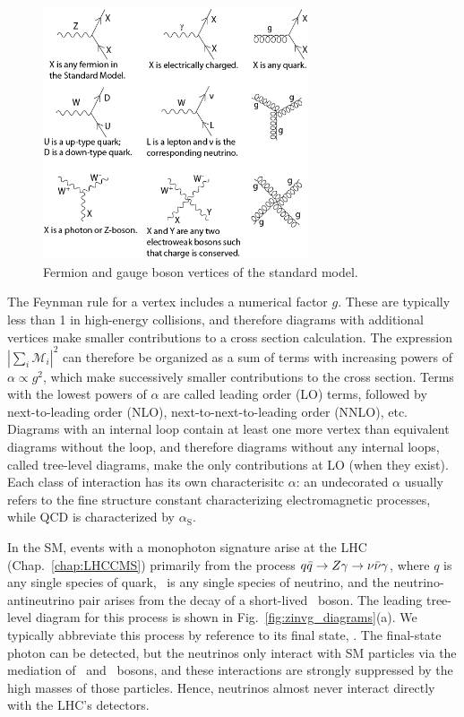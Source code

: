 \documentclass[oneside, letterpaper, 12pt, oldfontcommands]{memoir}
\begin{document}
\begin{figure}[hbtp]
  \begin{center}
    \includegraphics[width=0.7\textwidth]{Figures/Standard_Model_Feynman_Diagram_Vertices.png}
    \caption{
      Fermion and gauge boson vertices of the standard model.
    }
    \label{fig:sm_vertices}
  \end{center}
\end{figure}

The Feynman rule for a vertex includes a numerical factor $g$. These are typically less than 1 in high-energy collisions, and therefore diagrams
with additional vertices make smaller contributions to a cross section calculation.
The expression $|\sum_{i}{\mathcal{M}_{i}}|^{2}$ can therefore be organized as a sum of terms with increasing powers of $\alpha \propto g^{2}$, which make successively smaller
contributions to the cross section.
Terms with the lowest powers of $\alpha$ are called leading order (LO) terms, followed by next-to-leading order (NLO), next-to-next-to-leading order (NNLO), etc.
Diagrams with an internal loop contain at least one more vertex than equivalent diagrams without the loop, and therefore diagrams without any internal loops,
called tree-level diagrams, make the only contributions at LO (when they exist). Each class of interaction has its own characterisitc $\alpha$: an undecorated $\alpha$ usually
refers to the fine structure constant characterizing electromagnetic processes, while QCD is characterized by $\alpha_\mathrm{S}$.

In the SM, events with a monophoton signature arise at the LHC (Chap.~\ref{chap:LHCCMS}) primarily from the process $q\bar{q} \to Z\gamma \to \nu\bar{\nu}\gamma$,
where $q$ is any single species of quark, \Pn\ is any single species of neutrino, and the neutrino-antineutrino pair arises from the decay
of a short-lived \PZ\ boson. The leading tree-level diagram for this process is shown in Fig.~\ref{fig:zinvg_diagrams}(a). We typically abbreviate this process by
reference to its final state, \zinvg. The final-state photon can be detected, but the neutrinos only interact with SM particles via the mediation
of \PZ\ and \PW\ bosons, and these interactions are strongly suppressed by the high masses of those particles. Hence, neutrinos almost never interact directly with the LHC's detectors.
\end{document}
